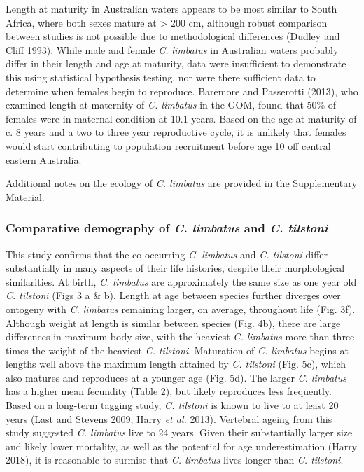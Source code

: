 \documentclass[]{article}
\begin{document}
Length at maturity in Australian waters appears to be most similar to
South Africa, where both sexes mature at \textgreater{} 200 cm, although
robust comparison between studies is not possible due to methodological
differences (Dudley and Cliff 1993). While male and female \emph{C.
limbatus} in Australian waters probably differ in their length and age
at maturity, data were insufficient to demonstrate this using
statistical hypothesis testing, nor were there sufficient data to
determine when females begin to reproduce. Baremore and Passerotti
(2013), who examined length at maternity of \emph{C. limbatus} in the
GOM, found that 50\% of females were in maternal condition at 10.1
years. Based on the age at maturity of c. 8 years and a two to three
year reproductive cycle, it is unlikely that females would start
contributing to population recruitment before age 10 off central eastern
Australia.

Additional notes on the ecology of \emph{C. limbatus} are provided in
the Supplementary Material.

\subsubsection{\texorpdfstring{Comparative demography of \emph{C.
limbatus} and \emph{C.
tilstoni}}{Comparative demography of C. limbatus and C. tilstoni}}\label{comparative-demography-of-c.-limbatus-and-c.-tilstoni}

This study confirms that the co-occurring \emph{C. limbatus} and
\emph{C. tilstoni} differ substantially in many aspects of their life
histories, despite their morphological similarities. At birth, \emph{C.
limbatus} are approximately the same size as one year old \emph{C.
tilstoni} (Figs 3 a \& b). Length at age between species further
diverges over ontogeny with \emph{C. limbatus} remaining larger, on
average, throughout life (Fig. 3f). Although weight at length is similar
between species (Fig. 4b), there are large differences in maximum body
size, with the heaviest \emph{C. limbatus} more than three times the
weight of the heaviest \emph{C. tilstoni}. Maturation of \emph{C.
limbatus} begins at lengths well above the maximum length attained by
\emph{C. tilstoni} (Fig. 5c), which also matures and reproduces at a
younger age (Fig. 5d). The larger \emph{C. limbatus} has a higher mean
fecundity (Table 2), but likely reproduces less frequently. Based on a
long-term tagging study, \emph{C. tilstoni} is known to live to at least
20 years (Last and Stevens 2009; Harry \emph{et al.} 2013). Vertebral
ageing from this study suggested \emph{C. limbatus} live to 24 years.
Given their substantially larger size and likely lower mortality, as
well as the potential for age underestimation (Harry 2018), it is
reasonable to surmise that \emph{C. limbatus} lives longer than \emph{C.
tilstoni}.
\end{document}
